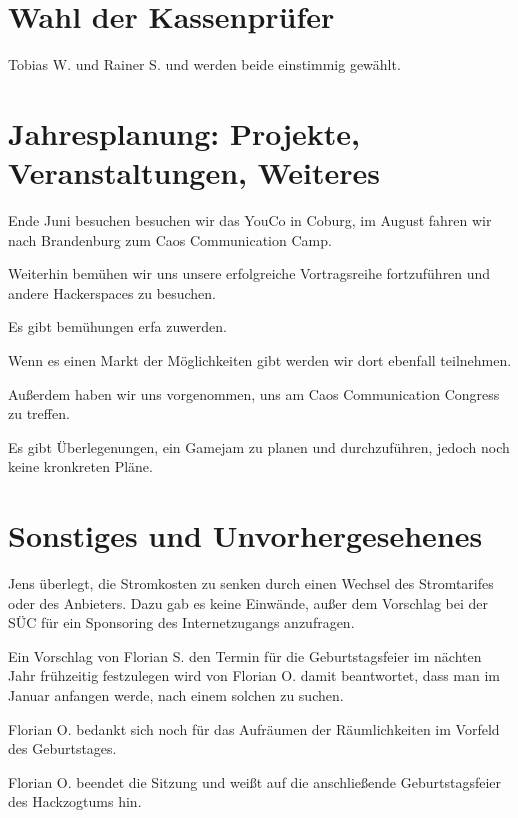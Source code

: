 \section{Wahl der Kassenprüfer}
 Tobias W. und Rainer S. und werden beide einstimmig gewählt. 
 
\section{Jahresplanung:   Projekte,   Veranstaltungen, Weiteres}
Ende Juni besuchen besuchen wir das YouCo in Coburg, im August fahren wir nach Brandenburg zum Caos Communication Camp.

Weiterhin bemühen wir uns unsere erfolgreiche Vortragsreihe fortzuführen und andere Hackerspaces zu besuchen.

Es gibt bemühungen erfa zuwerden. 

Wenn es einen Markt der Möglichkeiten gibt werden wir dort ebenfall teilnehmen.

Außerdem haben wir uns vorgenommen, uns am Caos Communication Congress zu treffen.

Es gibt Überlegenungen, ein Gamejam zu planen und durchzuführen, jedoch noch keine kronkreten Pläne.
 
\section{Sonstiges und Unvorhergesehenes}
Jens überlegt, die Stromkosten zu senken durch einen Wechsel des Stromtarifes oder des Anbieters.
Dazu gab es keine Einwände, außer dem Vorschlag bei der SÜC für ein Sponsoring des Internetzugangs anzufragen.

Ein Vorschlag von Florian S. den Termin für die Geburtstagsfeier im nächten Jahr frühzeitig festzulegen wird von Florian O. damit beantwortet, dass man im Januar anfangen werde, nach einem solchen zu suchen.

Florian O. bedankt sich noch für das Aufräumen der Räumlichkeiten im Vorfeld des Geburtstages.

 Florian O. beendet die Sitzung und weißt auf die anschließende Geburtstagsfeier des Hackzogtums hin. 
